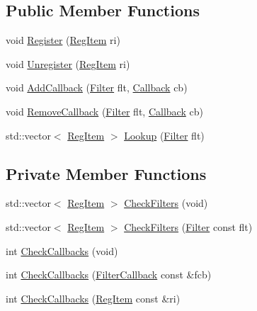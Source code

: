 \subsection*{Public Member Functions}
\begin{DoxyCompactItemize}
\item 
void \hyperlink{classregistry_1_1Registry_1_1Impl_a85e8ff2fc6f4aeb38d3757d9af276f03}{Register} (\hyperlink{classregistry_1_1RegItem}{Reg\+Item} ri)
\item 
void \hyperlink{classregistry_1_1Registry_1_1Impl_a8f5b6b353db1085370e980bb7b947cd5}{Unregister} (\hyperlink{classregistry_1_1RegItem}{Reg\+Item} ri)
\item 
void \hyperlink{classregistry_1_1Registry_1_1Impl_aef2278274443ae542fd42609fee58e2f}{Add\+Callback} (\hyperlink{classregistry_1_1Filter}{Filter} flt, \hyperlink{classregistry_1_1AbstractRegistry_a08a798ca9ca1c4c983ebd2386ca3c315}{Callback} cb)
\item 
void \hyperlink{classregistry_1_1Registry_1_1Impl_a4f8d094ae023b9b5a785ee2ae0ec3d70}{Remove\+Callback} (\hyperlink{classregistry_1_1Filter}{Filter} flt, \hyperlink{classregistry_1_1AbstractRegistry_a08a798ca9ca1c4c983ebd2386ca3c315}{Callback} cb)
\item 
std\+::vector$<$ \hyperlink{classregistry_1_1RegItem}{Reg\+Item} $>$ \hyperlink{classregistry_1_1Registry_1_1Impl_ad31604a9866736b72747d185a26e212e}{Lookup} (\hyperlink{classregistry_1_1Filter}{Filter} flt)
\end{DoxyCompactItemize}
\subsection*{Private Member Functions}
\begin{DoxyCompactItemize}
\item 
std\+::vector$<$ \hyperlink{classregistry_1_1RegItem}{Reg\+Item} $>$ \hyperlink{classregistry_1_1Registry_1_1Impl_ac29aa7df0f8ffb6c2e7aff88938b933a}{Check\+Filters} (void)
\item 
std\+::vector$<$ \hyperlink{classregistry_1_1RegItem}{Reg\+Item} $>$ \hyperlink{classregistry_1_1Registry_1_1Impl_a789ef808ca82b58f30d56de1543de6a3}{Check\+Filters} (\hyperlink{classregistry_1_1Filter}{Filter} const flt)
\item 
int \hyperlink{classregistry_1_1Registry_1_1Impl_ad4c82e293645478de0d0ad5e1dba9fed}{Check\+Callbacks} (void)
\item 
int \hyperlink{classregistry_1_1Registry_1_1Impl_a438306d63584a3668372c33bffb0ce28}{Check\+Callbacks} (\hyperlink{classregistry_1_1AbstractRegistry_a31f6bef634dcd324efebaf55f99b950f}{Filter\+Callback} const \&fcb)
\item 
int \hyperlink{classregistry_1_1Registry_1_1Impl_a9005f008525bd41b8770070ea14c30f5}{Check\+Callbacks} (\hyperlink{classregistry_1_1RegItem}{Reg\+Item} const \&ri)
\end{DoxyCompactItemize}
